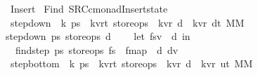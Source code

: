 %
\begin{isabellebody}%
%
%
\isadelimtheory
%
\endisadelimtheory
%
\isatagtheory
{}\isamarkupfalse%
\ Insert\isanewline
{}\ Find\ {\isachardoublequoteopen}{\isachardollar}SRC{\isacharslash}c{\isacharunderscore}monad{\isacharslash}Insert{\isacharunderscore}state{\isachardoublequoteclose}\isanewline
{}%
\endisatagtheory
{\isafoldtheory}%
%
\isadelimtheory
\isanewline
%
\endisadelimtheory
\isanewline
\isanewline
\isanewline
\isanewline
\isanewline
{}\isamarkupfalse%
\ step{\isacharunderscore}down\ {\isacharcolon}{\isacharcolon}\ {\isachardoublequoteopen}{\isacharprime}k\ ps{}\ {\isasymRightarrow}\ {\isacharparenleft}{\isacharprime}k{\isacharcomma}{\isacharprime}v{\isacharcomma}{\isacharprime}r{\isacharcomma}{\isacharprime}t{\isacharparenright}\ store{\isacharunderscore}ops\ {\isasymRightarrow}\ {\isacharparenleft}{\isacharprime}k{\isacharcomma}{\isacharprime}v{\isacharcomma}{\isacharprime}r{\isacharparenright}\ d\ {\isasymRightarrow}\ {\isacharparenleft}{\isacharparenleft}{\isacharprime}k{\isacharcomma}{\isacharprime}v{\isacharcomma}{\isacharprime}r{\isacharparenright}\ d{\isacharcomma}{\isacharprime}t{\isacharparenright}\ MM{\isachardoublequoteclose}\ \isanewline
{\isachardoublequoteopen}step{\isacharunderscore}down\ ps{}\ store{\isacharunderscore}ops\ d\ {\isacharequal}\ {\isacharparenleft}\isanewline
\ \ let\ {\isacharparenleft}fs{\isacharcomma}v{\isacharparenright}\ {\isacharequal}\ d\ in\isanewline
\ \ find{\isacharunderscore}step\ ps{}\ store{\isacharunderscore}ops\ fs\ {\isacharbar}{\isachargreater}\ fmap\ {\isacharparenleft}{\isacharpercent}\ d{\isacharprime}{\isachardot}\ {\isacharparenleft}d{\isacharprime}{\isacharcomma}v{\isacharparenright}{\isacharparenright}\isanewline
{\isacharparenright}{\isachardoublequoteclose}\isanewline
\isanewline
{}\isamarkupfalse%
\ step{\isacharunderscore}bottom\ {\isacharcolon}{\isacharcolon}\ {\isachardoublequoteopen}{\isacharprime}k\ ps{}\ {\isasymRightarrow}\ {\isacharparenleft}{\isacharprime}k{\isacharcomma}{\isacharprime}v{\isacharcomma}{\isacharprime}r{\isacharcomma}{\isacharprime}t{\isacharparenright}\ store{\isacharunderscore}ops\ {\isasymRightarrow}\ {\isacharparenleft}{\isacharprime}k{\isacharcomma}{\isacharprime}v{\isacharcomma}{\isacharprime}r{\isacharparenright}\ d\ {\isasymRightarrow}\ {\isacharparenleft}{\isacharparenleft}{\isacharprime}k{\isacharcomma}{\isacharprime}v{\isacharcomma}{\isacharprime}r{\isacharparenright}\ u{\isacharcomma}{\isacharprime}t{\isacharparenright}\ MM{\isachardoublequoteclose}\ \isanewline

\end{isabellebody}
